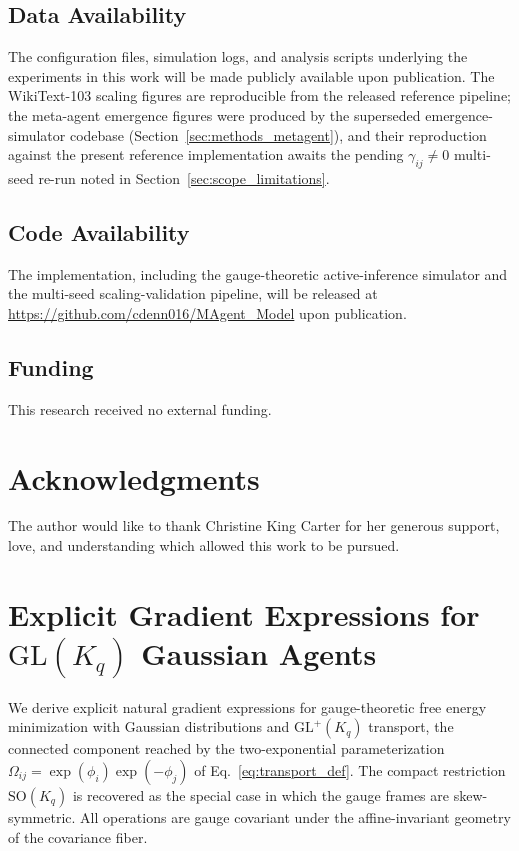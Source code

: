 \documentclass[11pt]{article}
\newenvironment{acknowledgments}
  {\section*{Acknowledgments}}
  {}
\begin{document}
\subsection*{Data Availability}
The configuration files, simulation logs, and analysis scripts underlying the experiments in this work will be made publicly available upon publication. The WikiText-103 scaling figures are reproducible from the released reference pipeline; the meta-agent emergence figures were produced by the superseded emergence-simulator codebase (Section~\ref{sec:methods_metagent}), and their reproduction against the present reference implementation awaits the pending $\gamma_{ij} \neq 0$ multi-seed re-run noted in Section~\ref{sec:scope_limitations}.

\subsection*{Code Availability}
The implementation, including the gauge-theoretic active-inference simulator and the multi-seed scaling-validation pipeline, will be released at \url{https://github.com/cdenn016/MAgent_Model} upon publication.

\subsection*{Funding}
This research received no external funding.

\begin{acknowledgments}
The author would like to thank Christine King Carter for her generous support, love, and understanding which allowed this work to be pursued.
\end{acknowledgments}

\appendix

\section*{Explicit Gradient Expressions for $\mathrm{GL}(K_q)$ Gaussian Agents}

We derive explicit natural gradient expressions for gauge-theoretic free energy minimization with Gaussian distributions and $\mathrm{GL}^+(K_q)$ transport, the connected component reached by the two-exponential parameterization $\Omega_{ij} = \exp(\phi_i)\exp(-\phi_j)$ of Eq.~\eqref{eq:transport_def}. The compact restriction $\mathrm{SO}(K_q)$ is recovered as the special case in which the gauge frames are skew-symmetric. All operations are gauge covariant under the affine-invariant geometry of the covariance fiber.
\end{document}
